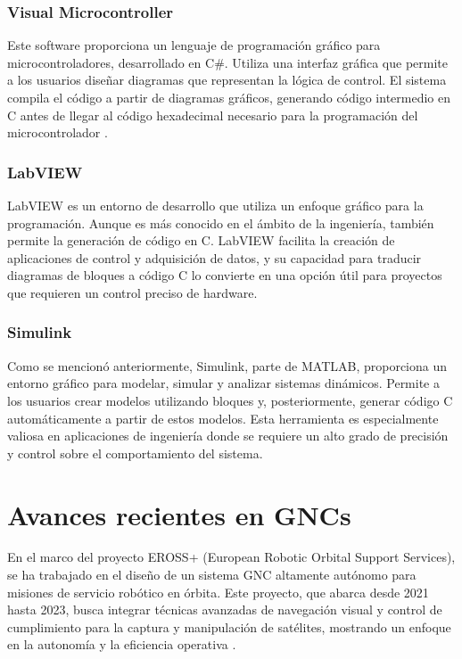 \subsubsection{Visual Microcontroller}
Este software proporciona un lenguaje de programación gráfico para microcontroladores, desarrollado en C\#. Utiliza una interfaz gráfica que permite a los 
usuarios diseñar diagramas que representan la lógica de control. El sistema compila el código a partir de diagramas gráficos, generando código intermedio 
en C antes de llegar al código hexadecimal necesario para la programación del microcontrolador \cite{Sacta2011DesarrolloDU}.


\subsubsection{LabVIEW}

LabVIEW es un entorno de desarrollo que utiliza un enfoque gráfico para la programación. Aunque es más conocido en el ámbito de la ingeniería, también 
permite la generación de código en C. LabVIEW facilita la creación de aplicaciones de control y adquisición de datos, y su capacidad para traducir 
diagramas de bloques a código C lo convierte en una opción útil para proyectos que requieren un control preciso de hardware.

\subsubsection{Simulink}
Como se mencionó anteriormente, Simulink, parte de MATLAB, proporciona un entorno gráfico para modelar, simular y analizar sistemas dinámicos. 
Permite a los usuarios crear modelos utilizando bloques y, posteriormente, generar código C automáticamente a partir de estos modelos. Esta 
herramienta es especialmente valiosa en aplicaciones de ingeniería donde se requiere un alto grado de precisión y control sobre el 
comportamiento del sistema.

\section{Avances recientes en GNCs }

En el marco del proyecto EROSS+ (European Robotic Orbital Support Services), se ha trabajado en el diseño de un sistema GNC altamente autónomo 
para misiones de servicio robótico en órbita. Este proyecto, que abarca desde 2021 hasta 2023, busca integrar técnicas avanzadas de navegación 
visual y control de cumplimiento para la captura y manipulación de satélites, mostrando un enfoque en la autonomía y la eficiencia operativa \cite{Casu2023EROSSPA}.

